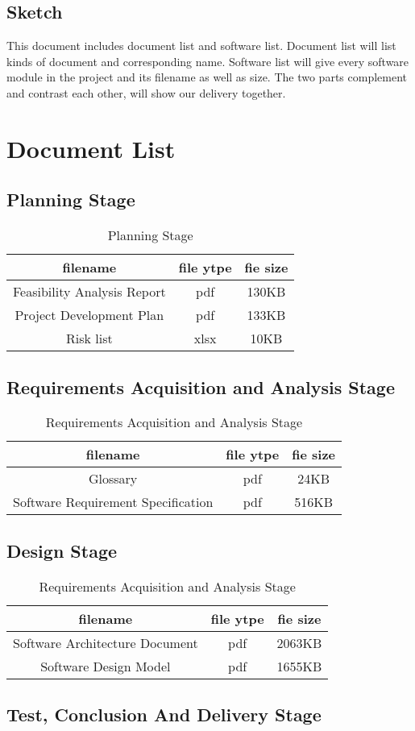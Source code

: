 \documentclass[10pt]{article}
\begin{document}
\subsection{Sketch}
This document includes document list and software list. Document list will list kinds of document and corresponding name. Software list will give every software module in the project and its filename as well as size. The two parts complement and contrast each other, will show our delivery together.

\section{Document List}
\subsection{Planning Stage}
\begin{table}[htb]
	\centering 

	\begin{tabular}{c|c|c} 
		\hline 
		filename&file ytpe&fie size\\
		\hline  
Feasibility Analysis Report&pdf&130KB\\
\hline
Project Development Plan&pdf&133KB\\
\hline
Risk list&xlsx&10KB\\
\hline
\end{tabular}

\caption{Planning Stage}
\end{table}

\subsection{Requirements Acquisition and Analysis Stage}
\begin{table}[htb]
	\centering

	\begin{tabular}{c|c|c} 
		\hline 
		filename&file ytpe&fie size\\
		\hline  
Glossary&pdf&24KB\\
\hline
Software Requirement Specification&pdf&516KB\\
\hline
\end{tabular} 
\caption{Requirements Acquisition and Analysis Stage}
\end{table}

\subsection{Design Stage}
\begin{table}[htb]
	\centering

	\begin{tabular}{c|c|c} 
		\hline 
		filename&file ytpe&fie size\\
		\hline  
Software Architecture Document&pdf&2063KB\\
\hline
Software Design Model&pdf&1655KB\\
\hline
\end{tabular}
\caption{Requirements Acquisition and Analysis Stage}
\end{table}

\subsection{Test, Conclusion And Delivery Stage}
\end{document}
